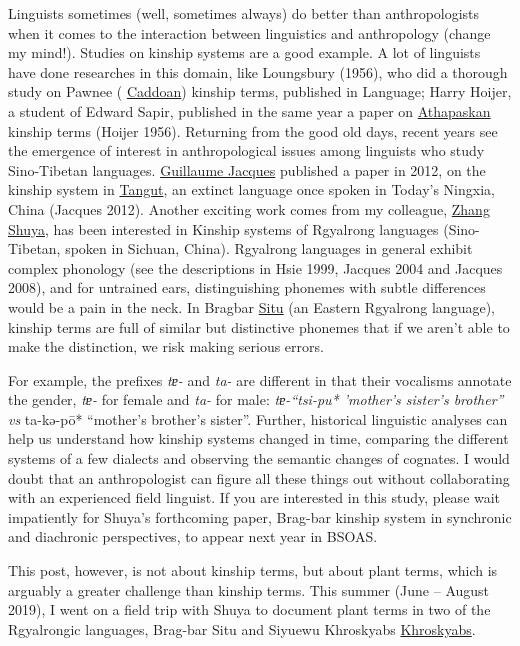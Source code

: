 \documentclass[
  a4paper,
  14pt,
  oneside,
  tablecaptionabove
]{scrbook}
\begin{document}
Linguists sometimes (well, sometimes always) do better than
anthropologists when it comes to the interaction between linguistics and
anthropology (change my mind!). Studies on kinship systems are a good
example. A lot of linguists have done researches in this domain, like
Loungsbury (1956), who did a thorough study on Pawnee (
\href{https://glottolog.org/resource/languoid/id/pawn1254}{Caddoan})
kinship terms, published in Language; Harry Hoijer, a student of Edward
Sapir, published in the same year a paper on
\href{https://glottolog.org/resource/languoid/id/atha1247}{Athapaskan}
kinship terms (Hoijer 1956). Returning from the good old days, recent
years see the emergence of interest in anthropological issues among
linguists who study Sino-Tibetan languages.
\href{https://panchr.hypotheses.org}{Guillaume Jacques} published a
paper in 2012, on the kinship system in
\href{https://glottolog.org/resource/languoid/id/tang1334}{Tangut}, an
extinct language once spoken in Today's Ningxia, China (Jacques 2012).
Another exciting work comes from my colleague,
\href{https://inalco.academia.edu/zhangshuya}{Zhang Shuya}, has been
interested in Kinship systems of Rgyalrong languages (Sino-Tibetan,
spoken in Sichuan, China). Rgyalrong languages in general exhibit
complex phonology (see the descriptions in Hsie 1999, Jacques 2004 and
Jacques 2008), and for untrained ears, distinguishing phonemes with
subtle differences would be a pain in the neck. In Bragbar
\href{https://glottolog.org/resource/languoid/id/situ1238}{Situ} (an
Eastern Rgyalrong language), kinship terms are full of similar but
distinctive phonemes that if we aren't able to make the distinction, we
risk making serious errors.

For example, the prefixes \emph{tɐ-} and \emph{ta-} are different in
that their vocalisms annotate the gender, \emph{tɐ-} for female and
\emph{ta-} for male: \emph{tɐ-\enquote{tsi-pu* 'mother's sister's
brother} vs }ta-kə-pō* \enquote{mother's brother's sister}. Further,
historical linguistic analyses can help us understand how kinship
systems changed in time, comparing the different systems of a few
dialects and observing the semantic changes of cognates. I would doubt
that an anthropologist can figure all these things out without
collaborating with an experienced field linguist. If you are interested
in this study, please wait impatiently for Shuya's forthcoming paper,
Brag-bar kinship system in synchronic and diachronic perspectives, to
appear next year in BSOAS.

This post, however, is not about kinship terms, but about plant terms,
which is arguably a greater challenge than kinship terms. This summer
(June -- August 2019), I went on a field trip with Shuya to document
plant terms in two of the Rgyalrongic languages, Brag-bar Situ and
Siyuewu Khroskyabs
\href{https://glottolog.org/resource/languoid/id/siya1242}{Khroskyabs}.
\end{document}
